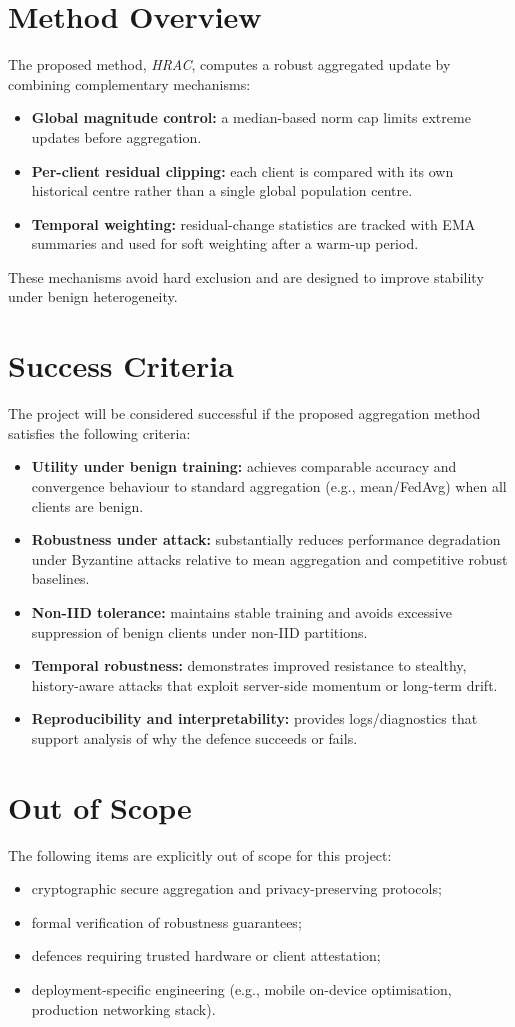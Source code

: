 \section{Method Overview}
The proposed method, \emph{HRAC}, computes a robust aggregated update by combining complementary mechanisms:
\begin{itemize}
    \item \textbf{Global magnitude control:} a median-based norm cap limits extreme updates before aggregation.
    \item \textbf{Per-client residual clipping:} each client is compared with its own historical centre rather than a single global population centre.
    \item \textbf{Temporal weighting:} residual-change statistics are tracked with EMA summaries and used for soft weighting after a warm-up period.
\end{itemize}
These mechanisms avoid hard exclusion and are designed to improve stability under benign heterogeneity.

\section{Success Criteria}
The project will be considered successful if the proposed aggregation method satisfies the following criteria:
\begin{itemize}
    \item \textbf{Utility under benign training:} achieves comparable accuracy and convergence behaviour to standard aggregation (e.g., mean/FedAvg) when all clients are benign.
    \item \textbf{Robustness under attack:} substantially reduces performance degradation under Byzantine attacks relative to mean aggregation and competitive robust baselines.
    \item \textbf{Non-IID tolerance:} maintains stable training and avoids excessive suppression of benign clients under non-IID partitions.
    \item \textbf{Temporal robustness:} demonstrates improved resistance to stealthy, history-aware attacks that exploit server-side momentum or long-term drift.
    \item \textbf{Reproducibility and interpretability:} provides logs/diagnostics that support analysis of why the defence succeeds or fails.
\end{itemize}

\section{Out of Scope}
The following items are explicitly out of scope for this project:
\begin{itemize}
    \item cryptographic secure aggregation and privacy-preserving protocols;
    \item formal verification of robustness guarantees;
    \item defences requiring trusted hardware or client attestation;
    \item deployment-specific engineering (e.g., mobile on-device optimisation, production networking stack).
\end{itemize}
